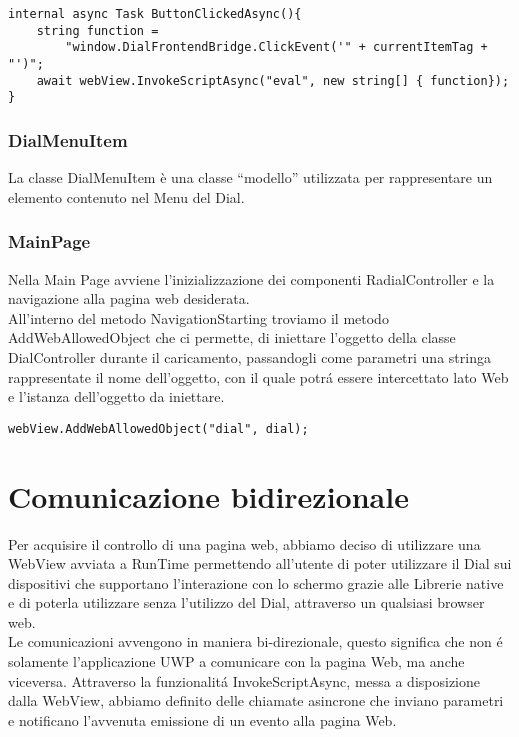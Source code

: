 \vspace{1.0cm}
\begin{lstlisting}[caption={Esempio Handler Eventi Dial},style=javaScriptCode]
internal async Task ButtonClickedAsync(){
	string function = 
		"window.DialFrontendBridge.ClickEvent('" + currentItemTag + "')";
    await webView.InvokeScriptAsync("eval", new string[] { function});
}
\end{lstlisting} 

\subsubsection{DialMenuItem}

La classe DialMenuItem è una classe “modello” utilizzata per rappresentare un elemento contenuto nel Menu del Dial.

\subsubsection{MainPage}

Nella Main Page avviene l’inizializzazione dei componenti RadialController e la navigazione alla pagina web desiderata.\\

All’interno del metodo NavigationStarting troviamo il metodo AddWebAllowedObject\cite{awao} che ci permette, di iniettare l’oggetto della classe DialController durante il caricamento, passandogli come parametri una stringa rappresentate il nome dell'oggetto, con il quale potrá essere intercettato lato Web e l'istanza dell'oggetto da iniettare.

\begin{lstlisting}[caption={Injection oggetto C\#},style=javaScriptCode]
webView.AddWebAllowedObject("dial", dial);
\end{lstlisting}

\newpage
\section{Comunicazione bidirezionale}
Per acquisire il controllo di una pagina web, abbiamo deciso di utilizzare una WebView avviata a RunTime permettendo all'utente di poter utilizzare il Dial sui dispositivi che supportano l'interazione con lo schermo grazie alle Librerie native e di poterla utilizzare senza l'utilizzo del Dial, attraverso un qualsiasi browser web.\\
 
Le comunicazioni avvengono in maniera bi-direzionale, questo significa che non é solamente l'applicazione UWP a comunicare con la pagina Web, ma anche viceversa.
Attraverso la funzionalitá InvokeScriptAsync, messa a disposizione dalla WebView, abbiamo definito delle chiamate asincrone che inviano parametri e notificano l'avvenuta emissione di un evento alla pagina Web.\\

